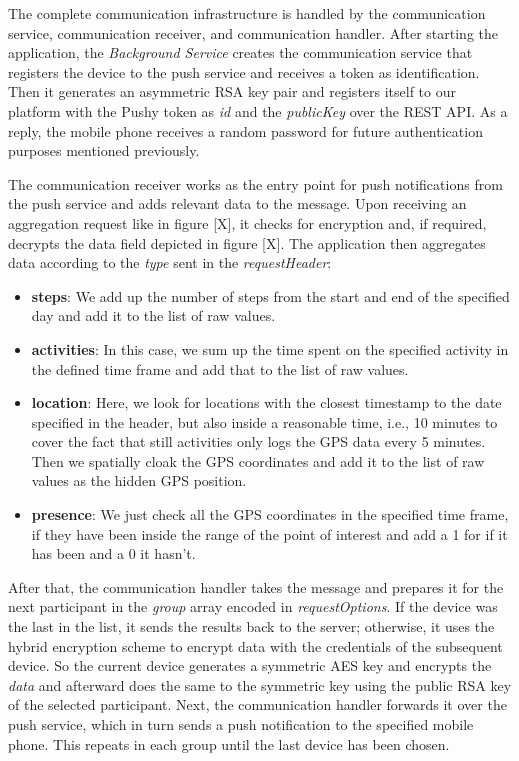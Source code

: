 The complete communication infrastructure is handled by the communication service, communication receiver, and communication handler. After starting the application, the \textit{Background Service} creates the communication service that registers the device to the push service and receives a token as identification. Then it generates an asymmetric RSA key pair and registers itself to our platform with the Pushy token as \textit{id} and the \textit{publicKey} over the REST API. As a reply, the mobile phone receives a random password for future authentication purposes mentioned previously.

The communication receiver works as the entry point for push notifications from the push service and adds relevant data to the message. Upon receiving an aggregation request like in figure [X], it checks for encryption and, if required, decrypts the data field depicted in figure [X]. The application then aggregates data according to the \textit{type} sent in the \textit{requestHeader}:
\begin{itemize}
    \item \textbf{steps}: We add up the number of steps from the start and end of the specified day and add it to the list of raw values.
    \item \textbf{activities}: In this case, we sum up the time spent on the specified activity in the defined time frame and add that to the list of raw values.
    \item \textbf{location}: Here, we look for locations with the closest timestamp to the date specified in the header, but also inside a reasonable time, i.e., 10 minutes to cover the fact that still activities only logs the GPS data every 5 minutes. Then we spatially cloak the GPS coordinates and add it to the list of raw values as the hidden GPS position.
    \item \textbf{presence}: We just check all the GPS coordinates in the specified time frame, if they have been inside the range of the point of interest and add a 1 for if it has been and a 0 it hasn't.
\end{itemize}

After that, the communication handler takes the message and prepares it for the next participant in the \textit{group} array encoded in \textit{requestOptions}. If the device was the last in the list, it sends the results back to the server; otherwise, it uses the hybrid encryption scheme to encrypt data with the credentials of the subsequent device. So the current device generates a symmetric AES key and encrypts the \textit{data} and afterward does the same to the symmetric key using the public RSA key of the selected participant. Next, the communication handler forwards it over the push service, which in turn sends a push notification to the specified mobile phone. This repeats in each group until the last device has been chosen.

